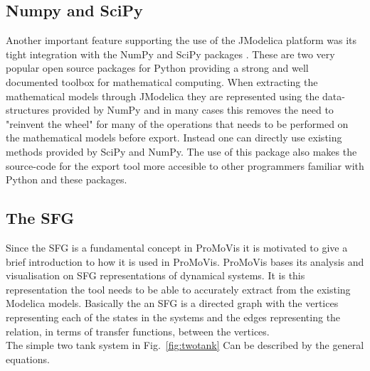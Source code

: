 \subsection{Numpy and SciPy}
Another important feature supporting the use of the JModelica platform was its tight integration with the NumPy and SciPy packages \cite{scipyorg}\nocite{*}. These are two very popular open source packages for Python providing a strong and well documented toolbox for mathematical computing. When extracting the mathematical models through JModelica they are represented using the data-structures provided by NumPy and in many cases this removes the need to "reinvent the wheel" for many of the operations that needs to be performed on the mathematical models before export. Instead one can directly use existing methods provided by SciPy and NumPy. The use of this package also makes the source-code for the export tool more accesible to other programmers familiar with Python and these packages.
\subsection{The SFG}
Since the SFG is a fundamental concept in ProMoVis it is motivated to give a brief introduction to how it is used in ProMoVis. ProMoVis bases its analysis and visualisation on SFG representations of dynamical systems. It is this representation the tool needs to be able to accurately extract from the existing Modelica models. Basically the an SFG is a directed graph with the vertices representing each of the states in the systems and the edges representing the relation, in terms of transfer functions, between the vertices.\\\newline The simple two tank system in Fig.~\ref{fig:twotank} Can be described by the general equations.

